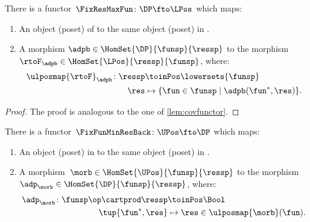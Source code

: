 \begin{lemma}
    \label{lem:confunctor}
    There is a functor~$\FixResMaxFun\colon \DP \fto \LPos$ which maps:
    \begin{enumerate}
        \item An object (poset) of \DP to the same object (poset) in \LPos.
        \item A morphism $\adpb \in \HomSet{\DP}{\funsp}{\ressp}$ to the morphism~$\rtoF_\adpb\in \HomSet{\LPos}{\ressp}{\funsp}$, where:
              \begin{equation*}
                  \begin{aligned}
                      \ulposmap{\rtoF}_\adpb\colon \ressp & \toinPos \lowersets{\funsp}                           \\
                      \res                                & \mapsto \{ \fun \in \funsp \mid \adpb(\fun^*,\res)\}.
                  \end{aligned}
              \end{equation*}
    \end{enumerate}
\end{lemma}

\begin{proof}
    The proof is analogous to the one of \cref{lem:covfunctor}.
\end{proof}

\begin{lemma}
    \label{lem:covfunctorback}
    There is a functor~$\FixFunMinResBack\colon \UPos \fto \DP$ which maps:
    \begin{enumerate}
        \item An object (poset) in \UPos to the same object (poset) in \DP.
        \item A morphism~$\morb\in \HomSet{\UPos}{\funsp}{\ressp}$ to the morphism~$\adp_\morb \in \HomSet{\DP}{\funsp}{\ressp}$, where:
              \begin{equation}
                  \begin{aligned}
                      \adp_\morb\colon \funsp\op \cartprod \ressp & \toinPos \Bool                           \\
                      \tup{\fun^*,\res}                           & \mapsto \res \in \ulposmap{\morb}(\fun).
                  \end{aligned}
              \end{equation}
    \end{enumerate}
\end{lemma}

